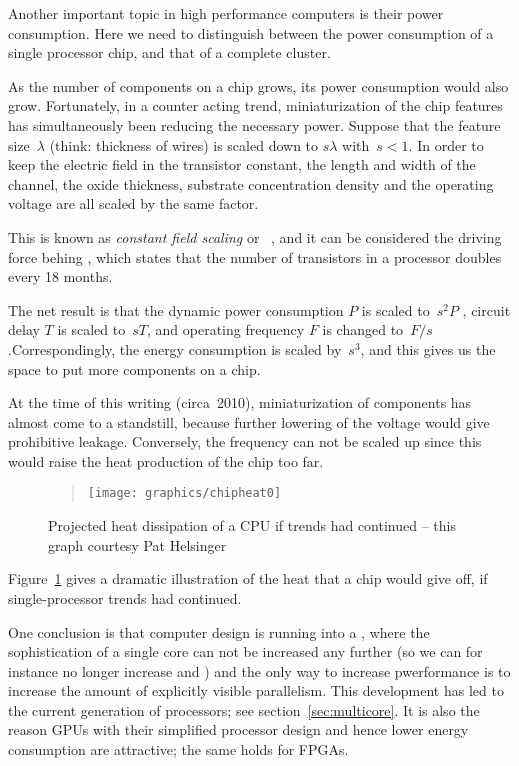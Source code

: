 Another important topic in high performance computers is their power
consumption. Here
we need to distinguish between the power consumption of a single
processor chip, and that of a complete cluster.

As the number of components on a chip grows, its power consumption
would also grow. Fortunately, in a counter acting trend,
miniaturization of the chip features has simultaneously been reducing
the necessary power. Suppose that the feature size~$\lambda$ (think:
thickness of wires) is scaled down to $s\lambda$ with~$s<1$. In order
to keep the electric field in the transistor constant, the length and
width of the channel, the oxide thickness, substrate concentration
density and the operating voltage are all scaled by the same factor.

This is known as \emph{constant field scaling} or
~\cite{Bohr:30yearDennard,Dennard:scaling},
and it can be considered the driving force behing , which states that the number of transistors in a processor
doubles every 18 months.

The net result
is that the dynamic power consumption $P$ is scaled to~$s^2P$ ,
circuit delay $T$ is scaled to~$sT$, and operating frequency $F$ is
changed to~$F/s$.Correspondingly, the energy consumption is scaled
by~$s^3$, and this gives us the space to put more components on a
chip.

At the time of this writing (circa~2010), miniaturization of
components has almost come to a standstill, because further lowering
of the voltage would give prohibitive leakage. Conversely, the
frequency can not be scaled up since this would raise the heat
production of the chip too far. 
%
\begin{figure}[ht]
  \begin{quote}
  \texttt{[image: graphics/chipheat0]}
  \end{quote}
  \caption{Projected heat dissipation of a CPU if trends had
    continued -- this graph courtesy Pat Helsinger}
  \label{fig:chipheat}
\end{figure}
%
Figure~\ref{fig:chipheat} gives a dramatic illustration of the heat
that a chip would give off, if single-processor trends had
continued.

One conclusion is that computer design
is running into a , where the sophistication
of a single core can not be increased any further (so we can for
instance no longer increase  and
) and the only way to increase
pwerformance is to increase the amount of explicitly visible
parallelism. This development has led to the current generation of
 processors; see section~\ref{sec:multicore}. It
is also the reason \acp{GPU} with their simplified processor design
and hence lower energy consumption
are attractive; the same holds for \acp{FPGA}.


